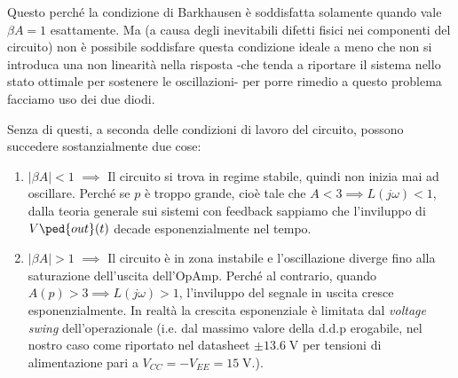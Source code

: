 \documentclass[10pt, a4paper, italian]{article}
\begin{document}
Questo perché la condizione di Barkhausen è soddisfatta solamente quando vale
$\beta A = 1$ esattamente. Ma (a causa degli inevitabili difetti fisici nei
componenti del circuito) non è possibile soddisfare questa condizione ideale
a meno che non si introduca una non linearità nella risposta -che tenda a
riportare il sistema nello stato ottimale per sostenere le oscillazioni- per
porre rimedio a questo problema facciamo uso dei due diodi.

Senza di questi, a seconda delle condizioni di lavoro del circuito, possono
succedere sostanzialmente due cose:
\begin{enumerate}
\item $|\beta A| < 1$ $\implies$ Il circuito si trova in regime stabile,
quindi non inizia mai ad oscillare. Perché se $p$ è troppo grande, cioè
tale che $A < 3 \implies L(j\omega) < 1$, dalla teoria generale sui sistemi
con feedback sappiamo che l'inviluppo di $V\ped{out}(t)$ decade
esponenzialmente nel tempo.
\item $|\beta A| > 1$ $\implies$ Il circuito è in zona instabile e
l'oscillazione diverge fino alla saturazione dell'uscita dell'OpAmp.
Perché al contrario, quando $A(p) > 3 \implies L(j\omega) > 1$,
l'inviluppo del segnale in uscita cresce esponenzialmente. In realtà la
crescita esponenziale è limitata dal \emph{voltage swing} dell'operazionale
(i.e. dal massimo valore della d.d.p erogabile, nel nostro caso come riportato
nel datasheet $\pm 13.6 \; \si{\V}$ per tensioni di alimentazione pari a
$V_{CC} = - V_{EE} = 15 \; \si{\V}$.).
\label{item: case2}
\end{enumerate}
\end{document}
